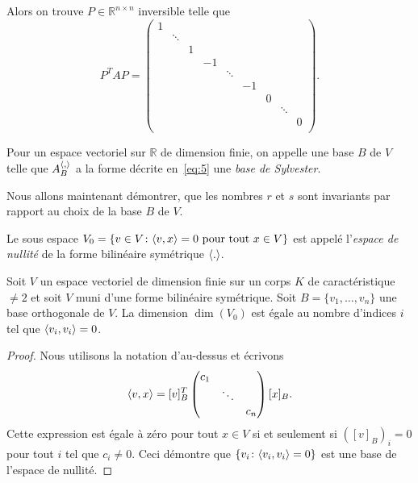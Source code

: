 Alors on trouve  $P ∈ ℝ^{n ×n}$ inversible telle que 
\begin{equation}
  \label{eq:5}
  P^T A P =
  \begin{pmatrix}
    1 &   \\
      & \ddots &  \\
      &        & 1 \\
      &        &  & -1 \\
      &        &  &    & \ddots \\
      &        &  &    &        & -1 \\
      &        &  &    &        &    & 0 \\
      &        &  &    &        &    &   & \ddots  \\
      &        &  &    &        &    &   &        & 0  \\

  \end{pmatrix}.
\end{equation}


\begin{definition}
  \label{def:37}
  Pour un espace vectoriel sur $ℝ$ de dimension finie, on appelle une base $B$ de $V$ telle que $A_B^{\langle {,} \rangle}$ a la forme décrite en~\eqref{eq:5} une \emph{base de Sylvester}. 
\end{definition}

Nous allons maintenant démontrer, que les nombres $r$ et $s$ sont invariants par rapport au choix de la base $B$ de $V$. 


\begin{definition}
  \label{def:11}
  Le sous espace $V_0 = \{v \in V \colon \langle {v,x} \rangle = 0 \text{ pour tout } x \in V\}$ est appelé l'\emph{espace de nullité} de la forme bilinéaire symétrique $\langle {.} \rangle$. 
\end{definition}

\begin{theorem}
  \label{thr:9}
  Soit $V$
  un espace vectoriel de dimension finie sur un corps $K$
  de caractéristique $\neq 2$
  et soit $V$
  muni d'une forme bilinéaire symétrique. Soit $B = \{v_1,\dots,v_n\}$
  une base orthogonale de $V$.
  La dimension $\dim(V_0)$
  est égale au nombre d'indices $i$ tel que $\langle {v_i,v_i} \rangle=0$.
\end{theorem}

\begin{proof}
  Nous utilisons la notation d'au-dessus et écrivons 
  \begin{displaymath}
    \langle {v,x} \rangle =   [v]_B^T
                    \begin{pmatrix}
                      c_1 & & \\
                                     & \ddots & \\
                                     & & c_n
                    \end{pmatrix} [x]_B. 
  \end{displaymath}
Cette expression est égale à zéro pour tout $x ∈V$  si et seulement si $\left([v]_B\right)_i = 0$ pour tout $i$ tel que $c_i \neq 0$. Ceci démontre que $\{ v_i \colon \langle {v_i,v_i} \rangle=0\}$ est une base de l'espace de nullité. 
\end{proof}

